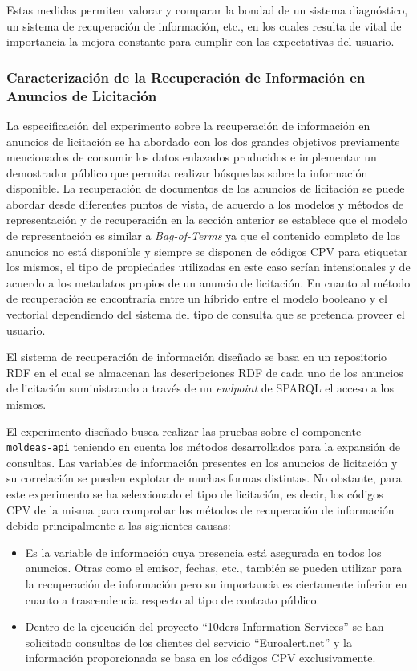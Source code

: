 Estas medidas permiten valorar y comparar la bondad de un sistema diagnóstico, un sistema de recuperación de información, etc., 
en los cuales resulta de vital de importancia la mejora constante para cumplir con las expectativas del usuario.

\subsubsection{Caracterización de la Recuperación de Información en Anuncios de Licitación}
La especificación del experimento sobre la recuperación de información en anuncios de licitación se ha abordado 
con los dos grandes objetivos previamente mencionados de consumir los datos enlazados producidos e implementar 
un demostrador público que permita realizar búsquedas sobre la información disponible. La recuperación 
de documentos de los anuncios de licitación se puede abordar desde diferentes puntos de vista, de acuerdo 
a los modelos y métodos de representación y de recuperación en la sección anterior se establece que 
el modelo de representación es similar a \textit{Bag-of-Terms} ya que el contenido completo de los anuncios 
no está disponible y siempre se disponen de códigos \gls{CPV} para etiquetar los mismos, el tipo de propiedades 
utilizadas en este caso serían intensionales y de acuerdo a los metadatos propios de un anuncio de licitación. En cuanto al método de 
recuperación se encontraría entre un híbrido entre el modelo booleano y el vectorial dependiendo del sistema del tipo 
de consulta que se pretenda proveer el usuario.

El sistema de recuperación de información diseñado se basa en un repositorio \gls{RDF} en el cual se almacenan las descripciones 
RDF de cada uno de los anuncios de licitación suministrando a través de un \textit{endpoint} de \gls{SPARQL} el acceso a los 
mismos. 

El experimento diseñado busca realizar las pruebas sobre el componente \texttt{moldeas-api} teniendo en cuenta 
los métodos desarrollados para la expansión de consultas. Las variables de información presentes en los anuncios 
de licitación y su correlación se pueden explotar de muchas formas distintas. No obstante, para este experimento 
se ha seleccionado el tipo de licitación, es decir, los códigos \gls{CPV} de la misma para comprobar los métodos de 
recuperación de información debido principalmente a las siguientes causas:

\begin{itemize}
 \item Es la variable de información cuya presencia está asegurada en todos los anuncios. Otras como el emisor, fechas, etc., también 
se pueden utilizar para la recuperación de información pero su importancia es ciertamente inferior en cuanto a trascendencia respecto 
al tipo de contrato público.
\item Dentro de la ejecución del proyecto ``10ders Information Services'' se han solicitado consultas de los clientes del 
servicio ``Euroalert.net'' y la información proporcionada se basa en los códigos CPV exclusivamente.
\end{itemize}

